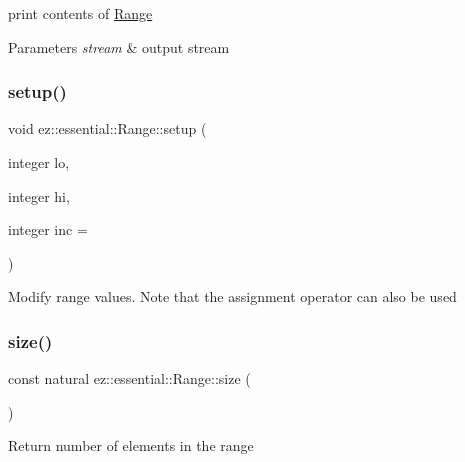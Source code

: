 print contents of \hyperlink{classez_1_1essential_1_1Range}{Range} 
\begin{DoxyParams}{Parameters}
{\em stream} & output stream \\
\hline
\end{DoxyParams}
\mbox{\label{classez_1_1essential_1_1Range_a77ce9b7d244288eb58cd7fc21b6a7973}} 
\subsubsection{\texorpdfstring{setup()}{setup()}}
{\footnotesize\ttfamily void ez\+::essential\+::\+Range\+::setup (\begin{DoxyParamCaption}\item[{integer}]{lo,  }\item[{integer}]{hi,  }\item[{integer}]{inc = {} }\end{DoxyParamCaption})\hspace{0.3cm}{\ttfamily [inline]}}

Modify range values. Note that the assignment operator can also be used \mbox{\label{classez_1_1essential_1_1Range_a4dbc591c1c1979fa4691da3a6bb2c4f6}} 
\subsubsection{\texorpdfstring{size()}{size()}}
{\footnotesize\ttfamily const natural ez\+::essential\+::\+Range\+::size (\begin{DoxyParamCaption}{ }\end{DoxyParamCaption})\hspace{0.3cm}{\ttfamily [inline]}}

Return number of elements in the range \mbox{\label{classez_1_1essential_1_1Range_a1ccac3c17a4cd0da27700f4e22419eee}} 
